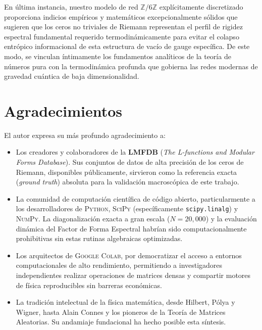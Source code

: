 \documentclass[aps,prl,preprint,superscriptaddress,floatfix]{revtex4-2}
\newcommand{\Zmod}{\mathbb{Z}/6\mathbb{Z}}
\begin{document}
En última instancia, nuestro modelo de red $\Zmod$ explícitamente discretizado proporciona indicios empíricos y matemáticos excepcionalmente sólidos que sugieren que los ceros no triviales de Riemann representan el perfil de rigidez espectral fundamental requerido termodinámicamente para evitar el colapso entrópico informacional de esta estructura de vacío de gauge específica. De este modo, se vinculan íntimamente los fundamentos analíticos de la teoría de números pura con la termodinámica profunda que gobierna las redes modernas de gravedad cuántica de baja dimensionalidad.

\section*{Agradecimientos}
El autor expresa su más profundo agradecimiento a:

\begin{itemize}
    \item Los creadores y colaboradores de la \textbf{LMFDB} (\textit{The L-functions and Modular Forms Database}). Sus conjuntos de datos de alta precisión de los ceros de Riemann, disponibles públicamente, sirvieron como la referencia exacta (\textit{ground truth}) absoluta para la validación macroscópica de este trabajo.
    \item La comunidad de computación científica de código abierto, particularmente a los desarrolladores de \textsc{Python}, \textsc{SciPy} (específicamente \texttt{scipy.linalg}) y \textsc{NumPy}. La diagonalización exacta a gran escala ($N=20,000$) y la evaluación dinámica del Factor de Forma Espectral habrían sido computacionalmente prohibitivas sin estas rutinas algebraicas optimizadas.
    \item Los arquitectos de \textsc{Google Colab}, por democratizar el acceso a entornos computacionales de alto rendimiento, permitiendo a investigadores independientes realizar operaciones de matrices densas y compartir motores de física reproducibles sin barreras económicas.
    \item La tradición intelectual de la física matemática, desde Hilbert, Pólya y Wigner, hasta Alain Connes y los pioneros de la Teoría de Matrices Aleatorias. Su andamiaje fundacional ha hecho posible esta síntesis.
\end{itemize}
\end{document}
